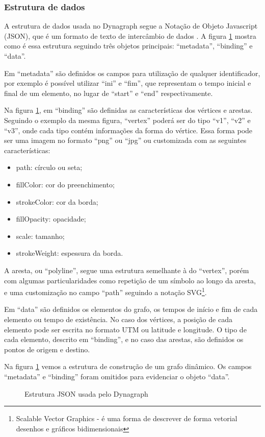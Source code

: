 \subsubsection{Estrutura de dados}

A estrutura de dados usada no Dynagraph segue a Notação de Objeto Javascript (JSON), que é um formato de texto de intercâmbio de dados \cite{douglas}.
A figura \ref{fig:jsondynagraph} mostra como é essa estrutura seguindo três objetos principais: ``metadata'', ``binding'' e ``data''.

Em ``metadata'' são definidos os campos para utilização de qualquer identificador, por exemplo é possível utilizar ``ini'' e ``fim'',
que representam o tempo inicial e final de um elemento, no lugar de ``start'' e ``end'' respectivamente.

Na figura \ref{fig:jsondynagraph}, em ``binding'' são definidas as características dos vértices e arestas.
Seguindo o exemplo da mesma figura, ``vertex'' poderá
ser do tipo ``v1'', ``v2'' e ``v3'', onde cada tipo contém informações da forma do vértice. Essa forma pode ser uma imagem no formato
``png'' ou ``jpg'' ou customizada com as seguintes características:
\begin{itemize}
\item path: círculo ou seta;
\item fillColor: cor do preenchimento;
\item strokeColor: cor da borda;
\item fillOpacity: opacidade;
\item scale: tamanho;
\item strokeWeight: espessura da borda.
\end{itemize}
A aresta, ou ``polyline'', segue uma estrutura semelhante à do ``vertex'', porém com algumas particularidades como repetição de um símbolo
ao longo da aresta, e uma customização no campo ``path'' seguindo a notação
SVG\footnote{\label{note} Scalable Vector Graphics - é uma forma de descrever de forma vetorial desenhos e gráficos bidimensionais}.

Em ``data'' são definidos os elementos do grafo, os tempos de início e fim de cada elemento ou tempo de existência.
No caso dos vértices, a posição de cada elemento pode ser escrita no formato UTM ou latitude e longitude.
O tipo de cada elemento, descrito em ``binding'', e no caso das arestas, são definidos os pontos de origem e destino.

Na figura \ref{fig:jsondynagraph} vemos a estrutura de construção de um grafo dinâmico.
Os campos ``metadata'' e ``binding'' foram omitidos para evidenciar o objeto ``data''.
\FloatBarrier

\begin{figure}[htbp]
  \caption{Estrutura JSON usada pelo Dynagraph}
  \label{fig:jsondynagraph}
\end{figure}


